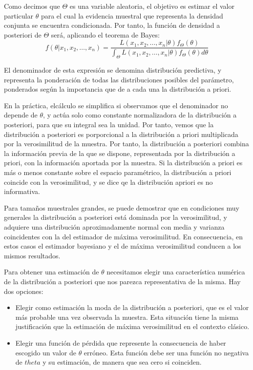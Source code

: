 Como decimos que $\Theta$ es una variable aleatoria, el objetivo es estimar el valor particular $\theta$ para el cual la evidencia muestral que representa la densidad conjunta se encuentra condicionada. Por tanto, la funci\'on de densidad a posteriori de $\Theta$ ser\'a, aplicando el teorema de Bayes:
\begin{equation*}
f(\theta|x_1,x_2,\ldots,x_n)=\dfrac{L(x_1,x_2,\ldots,x_n|\theta)f_{\Theta}(\theta)}{\int_{\Theta}L(x_1,x_2,\ldots,x_n|\theta)f_{\Theta}(\theta)d\theta}
\end{equation*}

El denominador de esta expresi\'on se denomina distribuci\'on predictiva, y representa la ponderaci\'on de todas las distribuciones posibles del par\'ametro, ponderados seg\'un la importancia que de a cada una la distribuci\'on a priori.

En la pr\'actica, elc\'alculo se simplifica si observamos que el denominador no depende de $\theta$, y act\'ua solo como constante normalizadora de la distribuci\'on a posteriori, para que su integral sea la unidad. Por tanto, vemos que la distribuci\'on a posteriori es porporcional a la distribuci\'on a priori multiplicada por la verosimilitud de la muestra. Por tanto, la distribuci\'on a posteriori combina la informaci\'on previa de la que se dispone, representada por la distribuci\'on a priori, con la informaci\'on aportada por la muestra. Si la distribuci\'on a priori es m\'as o menos constante sobre el espacio param\'etrico, la distribuci\'on a priori coincide con la verosimilitud, y se dice qe la distribuci\'on apriori es no informativa.

Para tama\~nos muestrales grandes, se puede demostrar que en condiciones muy generales la distribuci\'on a posteriori est\'a dominada por la verosimilitud, y adquiere una distribuci\'on aproximadamente normal con media y varianza coincidentes con la del estimador de m\'axima verosimilitud. En consecuencia, en estos casos el estimador bayesiano y el de m\'axima verosimilitud conducen a los mismos resultados.

Para obtener una estimaci\'on de $\theta$ necesitamos elegir una caracter\'istica num\'erica de la distribuci\'on a posteriori que nos parezca representativa de la misma. Hay dos opciones:
\begin{itemize}
\item Elegir como estimaci\'on la moda de la distribuci\'on a posteriori, que es el valor m\'as probable una vez observada la muestra. Esta situaci\'on tiene la misma justificaci\'on que la estimaci\'on de m\'axima verosimilitud en el contexto cl\'asico.
\item Elegir una funci\'on de p\'erdida que represente la consecuencia de haber escogido un valor de $\theta$ err\'oneo. Esta funci\'on debe ser una funci\'on no negativa de $theta$ y su estimaci\'on, de manera que sea cero si coinciden.
\end{itemize}

